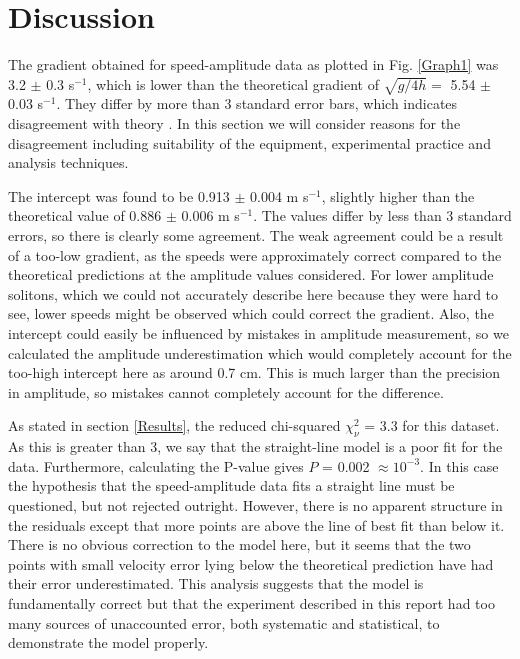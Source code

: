 \documentclass[10pt, twocolumn]{revtex4}    %
\begin{document}

\section{Discussion} 

The gradient obtained for speed-amplitude data as plotted in Fig. \ref{Graph1} was 3.2 $\pm$ 0.3 s$^{-1}$, which is lower than the theoretical gradient of $\sqrt{g/4h} =$ 5.54 $\pm$ 0.03 s$^{-1}$. They differ by more than 3 standard error bars, which indicates disagreement with theory \cite{Hughes}. In this section we will consider reasons for the disagreement including suitability of the equipment, experimental practice and analysis techniques. 

The intercept was found to be 0.913 $\pm$ 0.004 m s$^{-1}$, slightly higher than the theoretical value of 0.886 $\pm$ 0.006 m s$^{-1}$. The values differ by less than 3 standard errors, so there is clearly some agreement. The weak agreement could be a result of a too-low gradient, as the speeds were approximately correct compared to the theoretical predictions at the amplitude values considered. For lower amplitude solitons, which we could not accurately describe here because they were hard to see, lower speeds might be observed which could correct the gradient. Also, the intercept could easily be influenced by mistakes in amplitude measurement, so we calculated the amplitude underestimation which would completely account for the too-high intercept here as around 0.7 cm. This is much larger than the precision in amplitude, so mistakes cannot completely account for the difference. 

As stated in section \ref{Results}, the reduced chi-squared $\chi_\nu^2$ = 3.3 for this dataset. As this is greater than 3, we say that the straight-line model is a poor fit for the data. Furthermore, calculating the P-value gives $P$ = 0.002 $\approx 10^{-3}$. In this case the hypothesis that the speed-amplitude data fits a straight line must be questioned, but not rejected outright. However, there is no apparent structure in the residuals except that more points are above the line of best fit than below it. There is no obvious correction to the model here, but it seems that the two points with small velocity error lying below the theoretical prediction have had their error underestimated. This analysis suggests that the model is fundamentally correct but that the experiment described in this report had too many sources of unaccounted error, both systematic and statistical, to demonstrate the model properly.
\end{document}

